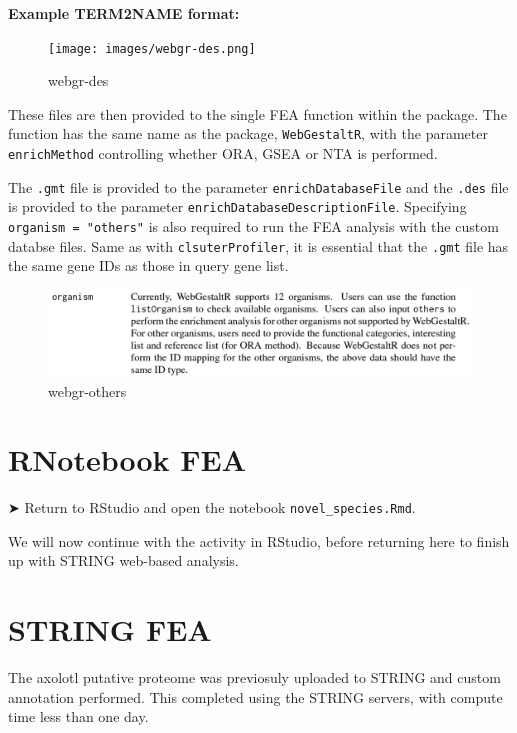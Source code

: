 \documentclass[
]{book}
\begin{document}
\textbf{Example TERM2NAME format:}

\begin{figure}
\centering
\texttt{[image: images/webgr-des.png]}
\caption{webgr-des}
\end{figure}

These files are then provided to the single FEA function within the package. The function has the same name as the package, \texttt{WebGestaltR}, with the parameter \texttt{enrichMethod} controlling whether ORA, GSEA or NTA is performed.

The \texttt{.gmt} file is provided to the parameter \texttt{enrichDatabaseFile} and the \texttt{.des} file is provided to the parameter \texttt{enrichDatabaseDescriptionFile}. Specifying \texttt{organism\ =\ "others"} is also required to run the FEA analysis with the custom databse files. Same as with \texttt{clsuterProfiler}, it is essential that the \texttt{.gmt} file has the same gene IDs as those in query gene list.

\begin{figure}
\centering
\includegraphics{images/webgestaltr-others-organisms.png}
\caption{webgr-others}
\end{figure}

\hypertarget{rnotebook-fea}{%
\section{RNotebook FEA}\label{rnotebook-fea}}

➤ Return to RStudio and open the notebook \texttt{novel\_species.Rmd}.

We will now continue with the activity in RStudio, before returning here to finish up with STRING web-based analysis.

\hypertarget{string-fea}{%
\section{STRING FEA}\label{string-fea}}

The axolotl putative proteome was previosuly uploaded to STRING and custom annotation performed. This completed using the STRING servers, with compute time less than one day.
\end{document}
